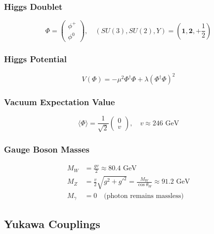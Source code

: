 \subsubsection{Higgs Doublet}

\begin{equation}
\Phi = \begin{pmatrix} \phi^+ \\ \phi^0 \end{pmatrix}, \quad (SU(3), SU(2), Y) = (\mathbf{1}, \mathbf{2}, +\frac{1}{2})
\end{equation}

\subsubsection{Higgs Potential}

\begin{equation}
V(\Phi) = -\mu^2 \Phi^\dagger\Phi + \lambda(\Phi^\dagger\Phi)^2
\end{equation}

\subsubsection{Vacuum Expectation Value}

\begin{equation}
\langle \Phi \rangle = \frac{1}{\sqrt{2}}\begin{pmatrix} 0 \\ v \end{pmatrix}, \quad v \approx 246 \text{ GeV}
\end{equation}

\subsubsection{Gauge Boson Masses}

\begin{align}
M_W &= \frac{gv}{2} \approx 80.4 \text{ GeV} \label{eq:canonical:W_mass} \\
M_Z &= \frac{v}{2}\sqrt{g^2 + g'^2} = \frac{M_W}{\cos\theta_W} \approx 91.2 \text{ GeV} \label{eq:canonical:Z_mass} \\
M_\gamma &= 0 \quad \text{(photon remains massless)} \label{eq:canonical:photon_mass}
\end{align}

\subsection{Yukawa Couplings}

